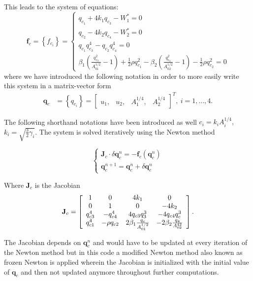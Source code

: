 \documentclass[a4paper, oneside]{discothesis}
\begin{document}
This leads to the system of equations:
$$
\mathbf{f}_c=\left\{f_{c_i}\right\}=\left\{\begin{array}{l}
		q_{c_1}+4 k_1 q_{c_3}-W_1^*=0 \\
		q_{c_2}-4 k_2 q_{c_4}-W_2^*=0 \\
		q_{c_1} q_{c_3}^4-q_{c_2} q_{c_4}^4=0 \\
		\beta_1\left(\frac{q_{c_3}^2}{A_{01}^{1 / 2}}-1\right)+\frac{1}{2} \rho q_{c_1}^2-\beta_2\left(\frac{q_{c_4}^2}{A_{02}^{1 / 2}}-1\right)-\frac{1}{2} \rho q_{c_2}^2=0
\end{array}\right.
$$
where we have introduced the following notation in order to more easily write this system in a matrix-vector form
$$
\begin{aligned}
	\mathbf{q}_c&=\left\{q_{c_i}\right\}=\left[\begin{array}{llll}
		u_1, & u_2, & A_1^{1 / 4}, & A_2^{1 / 4}
\end{array}\right]^T,\  i=1, \ldots, 4. 
\end{aligned}
$$

The following shorthand notations have been introduced as well $c_i=k_i A_i^{1 / 4},$  $k_i=\sqrt{\frac{3}{2} \gamma_i}$.
The system is solved iteratively using the Newton method

$$
\left\{\begin{array}{l}
		\mathbf{J}_c \cdot \delta \mathbf{q}_c^n=-\mathbf{f}_c\left(\mathbf{q}_c^n\right) \\
		\mathbf{q}_c^{n+1}=\mathbf{q}_c^n+\delta \mathbf{q}_c^n
\end{array}\right.
$$

Where $\mathbf{J}_c$ is the Jacobian
$$\mathbf{J}_{c}=\left[\begin{array}{c c c c}{{{1}}}&{{0}}&{{{4}k_{1}}}&{{0}}\\ {{0}}&{{{1}}}&{{0}}&{{-4k_{2}}}\\ {{q_{c3}^{4}}}&{{-q_{c4}^{4}}}&{{4q_{c3}q_{3}^{3}}}&{{-4q_{c4}q_{c}^{3}}}\\ {{q_{c1}^{4}}}&{{-\rho q_{c2}}}&{{2\beta_{1}\frac{q_{c}}{A_{01}^{1/2}}}}&{{-2\beta_{2}\frac{q_{4}}{A_{02}^{42}}}}\end{array}\right].$$

The Jacobian depends on $\mathbf{q}_c^n$ and would have to be updated at every iteration of the Newton method but in this code a modified Newton method also known as frozen Newton is applied wherein the Jacobian is initialized with the initial value of $\mathbf{q}_c$ and then not updated anymore throughout further computations.
\end{document}
